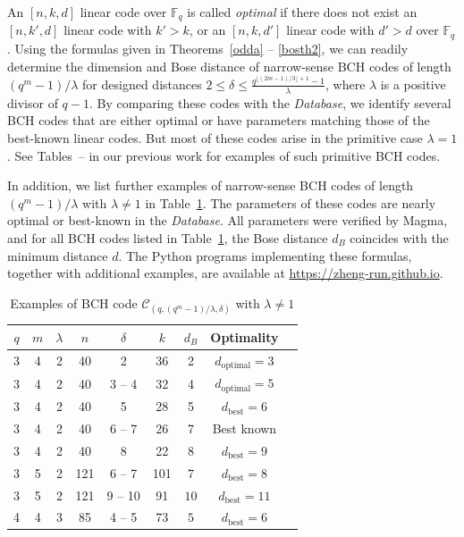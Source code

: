 \documentclass[journal,onecolumn]{IEEEtran}
\begin{document}
An $[n,k,d]$ linear code over $\mathbb{F}_q$ is called \emph{optimal} if there does not exist an $[n,k',d]$ linear code with $k' > k$, or an $[n,k,d']$ linear code with $d' > d$ over $\mathbb{F}_q$.
Using the formulas given in Theorems~\ref{odda} -- \ref{bosth2}, we can readily determine the dimension and Bose distance of narrow-sense BCH codes of length 
$(q^m-1)/\lambda$ for designed distances  $
2 \le \delta \le \frac{q^{\lfloor (2m-1)/3\rfloor+1}-1}{\lambda}$, where $\lambda$ is a positive divisor of $q-1$. 
  By comparing these codes with the \textit{Database}, we identify several BCH codes that are either optimal or have parameters matching those of the best-known linear codes.
But most of these codes arise in the primitive case $\lambda = 1$. See Tables~\uppercase\expandafter{}--\uppercase\expandafter{} in our previous work \cite{zheng2025} for examples of such primitive BCH codes. 

In addition, we list further examples of narrow-sense BCH codes of length $(q^m-1)/\lambda$ with $\lambda \neq 1$ in Table~\ref{table1}. The parameters of these codes are nearly optimal or best-known in the \textit{Database}. All parameters were verified by Magma, and for all BCH codes listed in Table~\ref{table1}, the Bose distance $d_B$ coincides with the minimum distance $d$. The Python programs implementing these formulas, together with additional examples, are available at \url{https://zheng-run.github.io}.






\begin{table}[htbp]
\centering
\caption{Examples of BCH code $\mathcal{C}_{(q,(q^m-1)/\lambda,\delta)}$ with $\lambda\neq 1$} 
\label{table1}
\centering
\begin{tabular}{|c|c|c|c|c|c|c|c|c|}
\hline
$q$&	$m$&	$\lambda$&	$n$&	$\delta$&	$k$&	$d_B$& 	Optimality\\ \hline
3&	4&	2&	40&	2&	36&	2&	$d_{\text{optimal}}=3$\\ \hline
3&	4&	2&	40&	3 -- 4&	32&	4	& $d_{\text{optimal}}=5$\\ \hline
3&	4&	2&	40&	5&	28&	5&	$d_{\text{best}}=6$\\ \hline
3&	4&	2&	40&	6 -- 7&	26&	7	&Best known \\ \hline
3&	4&	2&	40&	8&	22&	8&	$d_{\text{best}}=9$\\ \hline
3&	5&	2&	121&	6 -- 7&	101&	$7$&	$d_{\text{best}}=8$\\ \hline
3&	5&	2&	121&	9 -- 10&	91&	$10$	&$d_{\text{best}}=11$\\ \hline
4&	4&	3&	85&	4 -- 5 &	73 &	$5$	&$d_{\text{best}}=6$\\ \hline
\end{tabular} 
\end{table}
\end{document}
